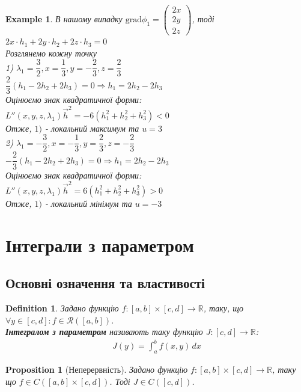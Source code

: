 \documentclass[a4paper, 10pt]{article}
\def\bigline{\vspace{5mm}\\}
\theoremstyle{theoremdd}
\theoremstyle{theoremdd}
\newtheorem{definition}[theorem]{Definition}
\theoremstyle{theoremdd}
\theoremstyle{theoremdd}
\newtheorem{example}[theorem]{Example}
\theoremstyle{theoremdd}
\newtheorem{proposition}[theorem]{Proposition}
\theoremstyle{theoremdd}
\theoremstyle{theoremdd}
\theoremstyle{theoremdd}
\begin{document}
\begin{example}
В нашому випадку $\textrm{grad} \phi_1 = \begin{pmatrix}
2x \\ 2y \\ 2z
\end{pmatrix}$, тоді\\
$2x \cdot h_1 + 2y \cdot h_2 + 2z \cdot h_3 = 0$\\
Розглянемо кожну точку\\
1) $\lambda_1 = \dfrac{3}{2}, x = \dfrac{1}{3}, y = -\dfrac{2}{3}, z = \dfrac{2}{3}$\\
$\dfrac{2}{3} \left(h_1 - 2h_2 + 2h_3 \right) = 0 \Rightarrow h_1 = 2h_2 - 2h_3$\\
Оцінюємо знак квадратичної форми:\\
$L''(x,y,z,\lambda_1) \vec{h}^2 = -6(h_1^2+h_2^2+h_3^2) < 0$\\
Отже, $1)$ - локальний максимум та $u = 3$
\bigline
2) $\lambda_1 = -\dfrac{3}{2}, x = -\dfrac{1}{3}, y = \dfrac{2}{3}, z = -\dfrac{2}{3}$\\
$-\dfrac{2}{3} \left(h_1 - 2h_2 + 2h_3 \right) = 0 \Rightarrow h_1 = 2h_2 - 2h_3$\\
Оцінюємо знак квадратичної форми:\\
$L''(x,y,z,\lambda_1) \vec{h}^2 = 6(h_1^2+h_2^2+h_3^2) > 0$\\
Отже, $1)$ - локальний мінімум та $u = -3$

\end{example}
\newpage

\section{Інтеграли з параметром}
\subsection{Основні означення та властивості}
\begin{definition}
Задано функцію $f: [a,b] \times [c,d] \to \mathbb{R}$, таку, що $\forall y \in [c,d]: f \in \mathcal{R}([a,b])$.\\
\textbf{Інтегралом з параметром} називають таку функцію $J: [c,d] \to \mathbb{R}$:
\begin{align*}
J(y) = \int_a^b f(x,y)\,dx
\end{align*}
\end{definition}

\begin{proposition}[Неперервність]
Задано функцію $f: [a,b] \times [c,d] \to \mathbb{R}$, таку що $f \in C([a,b] \times [c,d])$. Тоді $J \in C([c,d])$.
\end{proposition}
\end{document}
